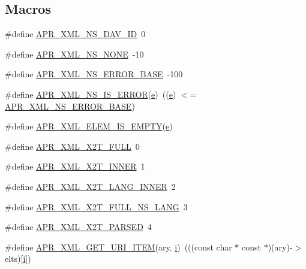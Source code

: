\subsection*{Macros}
\begin{DoxyCompactItemize}
\item 
\#define \hyperlink{group__APR__Util__XML_gad856851edabebf42e4150597c6f9d2c2}{A\+P\+R\+\_\+\+X\+M\+L\+\_\+\+N\+S\+\_\+\+D\+A\+V\+\_\+\+ID}~0
\item 
\#define \hyperlink{group__APR__Util__XML_ga2eed42f7f5e2b1932141f6bb5594b042}{A\+P\+R\+\_\+\+X\+M\+L\+\_\+\+N\+S\+\_\+\+N\+O\+NE}~-\/10
\item 
\#define \hyperlink{group__APR__Util__XML_ga949c1a93de86c67576a0f2f225208447}{A\+P\+R\+\_\+\+X\+M\+L\+\_\+\+N\+S\+\_\+\+E\+R\+R\+O\+R\+\_\+\+B\+A\+SE}~-\/100
\item 
\#define \hyperlink{group__APR__Util__XML_ga65029fb8740ec9eb85562df1300d125f}{A\+P\+R\+\_\+\+X\+M\+L\+\_\+\+N\+S\+\_\+\+I\+S\+\_\+\+E\+R\+R\+OR}(\hyperlink{pcregrep_8txt_acd90314acb2c2e5cd19681136c08efac}{e})~((\hyperlink{pcregrep_8txt_acd90314acb2c2e5cd19681136c08efac}{e}) $<$= \hyperlink{group__APR__Util__XML_ga949c1a93de86c67576a0f2f225208447}{A\+P\+R\+\_\+\+X\+M\+L\+\_\+\+N\+S\+\_\+\+E\+R\+R\+O\+R\+\_\+\+B\+A\+SE})
\item 
\#define \hyperlink{group__APR__Util__XML_gaa5792e7a2aa38dc98a93b0762c98441f}{A\+P\+R\+\_\+\+X\+M\+L\+\_\+\+E\+L\+E\+M\+\_\+\+I\+S\+\_\+\+E\+M\+P\+TY}(\hyperlink{pcregrep_8txt_acd90314acb2c2e5cd19681136c08efac}{e})
\item 
\#define \hyperlink{group__APR__Util__XML_gaeb48abf8de020df9bad57cfc7ca35747}{A\+P\+R\+\_\+\+X\+M\+L\+\_\+\+X2\+T\+\_\+\+F\+U\+LL}~0
\item 
\#define \hyperlink{group__APR__Util__XML_ga715a5e536efbfa24854531008cf4bdce}{A\+P\+R\+\_\+\+X\+M\+L\+\_\+\+X2\+T\+\_\+\+I\+N\+N\+ER}~1
\item 
\#define \hyperlink{group__APR__Util__XML_ga4cd40106902732169b8fe7579ba2e67c}{A\+P\+R\+\_\+\+X\+M\+L\+\_\+\+X2\+T\+\_\+\+L\+A\+N\+G\+\_\+\+I\+N\+N\+ER}~2
\item 
\#define \hyperlink{group__APR__Util__XML_ga7b2cd4c48940cd95a56ace294a94d938}{A\+P\+R\+\_\+\+X\+M\+L\+\_\+\+X2\+T\+\_\+\+F\+U\+L\+L\+\_\+\+N\+S\+\_\+\+L\+A\+NG}~3
\item 
\#define \hyperlink{group__APR__Util__XML_ga353a5e38ba709b2f158dabdbe05d3074}{A\+P\+R\+\_\+\+X\+M\+L\+\_\+\+X2\+T\+\_\+\+P\+A\+R\+S\+ED}~4
\item 
\#define \hyperlink{group__APR__Util__XML_gaf31ae94be9e1db1ee0175f7c0c40e3a7}{A\+P\+R\+\_\+\+X\+M\+L\+\_\+\+G\+E\+T\+\_\+\+U\+R\+I\+\_\+\+I\+T\+EM}(ary,  \hyperlink{group__MOD__PROXY_ga38403a0592eb8018a3ad61aef0f7ca2c}{i})~(((const char $\ast$ const $\ast$)(ary)-\/$>$elts)\mbox{[}\hyperlink{group__MOD__PROXY_ga38403a0592eb8018a3ad61aef0f7ca2c}{i}\mbox{]})
\end{DoxyCompactItemize}
